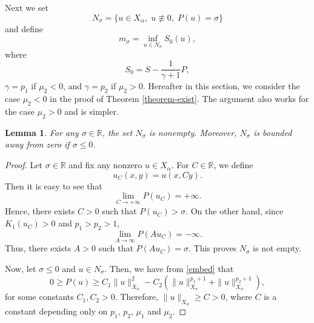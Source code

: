 \documentclass[10pt]{article}
\numberwithin{equation}{section}
\newtheorem{lemma}[theorem]{\quad Lemma}
\newcommand{\mo}{\mu_1}  \newcommand{\po}{{p_1}}
\newcommand{\moo}{\mu_2}  \newcommand{\poo}{{p_2}}
\newcommand{\al}{\alpha}
\newcommand{\rr}{\mathbb{R}}
\begin{document}
	Next we set
	\[
	N_\sigma=\{u\in X_\al,\;u\not\equiv0,\; P(u)=\sigma\}
	\]
	and %
	define
	\begin{equation}
		m_\sigma=\inf_{u\in N_\sigma} S_0(u),
	\end{equation}
	where\[
	S_0=S-\frac{1}{\gamma+1}P,
	\]
	$\gamma=\po$ if $\mu_2<0$, and $\gamma=\poo$ if $\moo>0$.
	Hereafter in this section, we consider the case $\moo<0$ in the proof of Theorem \ref{theorem-exist}. The argument also works for the case $\moo>0$ and is simpler. 
	\begin{lemma}\label{lem23}
		For any $\sigma\in\rr$, the set $N_\sigma$ is nonempty. Moreover, $N_\sigma$ is bounded away from zero if $\sigma\leq0$.
	\end{lemma}
	\begin{proof}
		Let $\sigma\in\rr$ and fix any nonzero $u\in X_\al$. For $C\in\rr$, we define
		\[
		u_C(x,y)=u(x,Cy).
		\]
		Then it is easy to see that  
		\[
		\lim_{C\to+\infty}	P(u_C)=+\infty.
		\]
		Hence, there exists $C>0$ such that $P(u_C)>\sigma$. On the other hand, since $K_1(u_C)>0$ and $p_1>p_2>1$,
		\[
		\lim_{A\to\infty}P(Au_C)=-\infty.
		\]
		Thus, there exists $A>0$ such that $P(Au_C)=\sigma$. This proves $N_\sigma$ is not empty.
		
		Now, let $\sigma\leq0$ and $u\in N_\sigma$. Then, we have from \eqref{embed} that
		\[
		0\geq P(u)\geq C_1\|u\|_{X_\al}^2-C_2(\|u\|_{X_\al}^{\po+1}+\|u\|_{X_\al}^{\poo+1}),
		\]
		for some constants $C_1,C_2>0$. Therefore, $\|u\|_{X_\al}\geq C>0$, where $C$ is a constant depending only on $\po$, $\poo$, $\mo$ and $\moo$.
	\end{proof}
	
\end{document}
